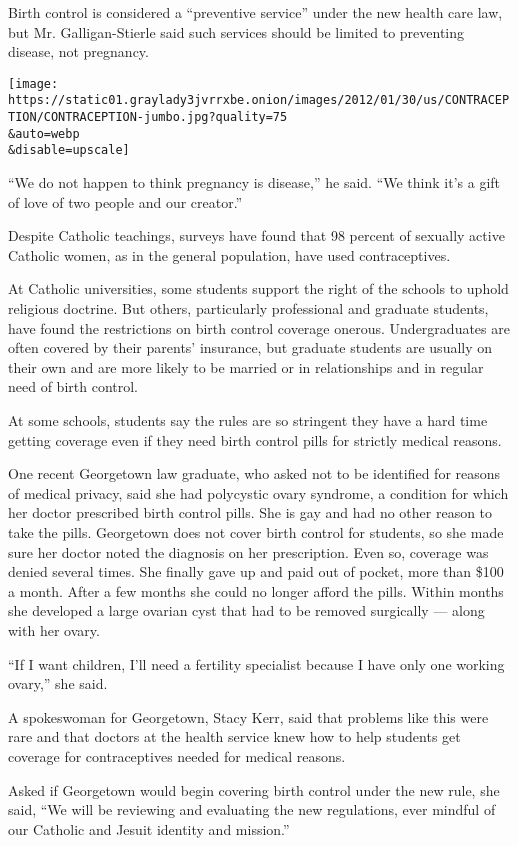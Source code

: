 Birth control is considered a ``preventive service'' under the new
health care law, but Mr. Galligan-Stierle said such services should be
limited to preventing disease, not pregnancy.

\texttt{[image: https://static01.graylady3jvrrxbe.onion/images/2012/01/30/us/CONTRACEPTION/CONTRACEPTION-jumbo.jpg?quality=75\\\&auto=webp\\\&disable=upscale]}

``We do not happen to think pregnancy is disease,'' he said. ``We think
it's a gift of love of two people and our creator.''

Despite Catholic teachings, surveys have found that 98 percent of
sexually active Catholic women, as in the general population, have used
contraceptives.

At Catholic universities, some students support the right of the schools
to uphold religious doctrine. But others, particularly professional and
graduate students, have found the restrictions on birth control coverage
onerous. Undergraduates are often covered by their parents' insurance,
but graduate students are usually on their own and are more likely to be
married or in relationships and in regular need of birth control.

At some schools, students say the rules are so stringent they have a
hard time getting coverage even if they need birth control pills for
strictly medical reasons.

One recent Georgetown law graduate, who asked not to be identified for
reasons of medical privacy, said she had polycystic ovary syndrome, a
condition for which her doctor prescribed birth control pills. She is
gay and had no other reason to take the pills. Georgetown does not cover
birth control for students, so she made sure her doctor noted the
diagnosis on her prescription. Even so, coverage was denied several
times. She finally gave up and paid out of pocket, more than \$100 a
month. After a few months she could no longer afford the pills. Within
months she developed a large ovarian cyst that had to be removed
surgically --- along with her ovary.

``If I want children, I'll need a fertility specialist because I have
only one working ovary,'' she said.

A spokeswoman for Georgetown, Stacy Kerr, said that problems like this
were rare and that doctors at the health service knew how to help
students get coverage for contraceptives needed for medical reasons.

Asked if Georgetown would begin covering birth control under the new
rule, she said, ``We will be reviewing and evaluating the new
regulations, ever mindful of our Catholic and Jesuit identity and
mission.''

